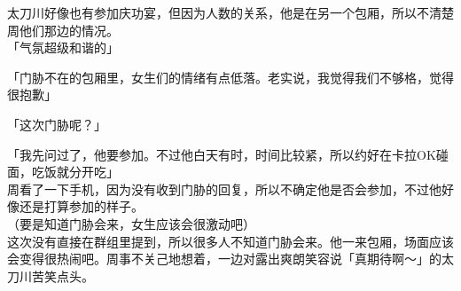 太刀川好像也有参加庆功宴，但因为人数的关系，他是在另一个包厢，所以不清楚周他们那边的情况。\\

「气氛超级和谐的」

「门胁不在的包厢里，女生们的情绪有点低落。老实说，我觉得我们不够格，觉得很抱歉」

「这次门胁呢？」

「我先问过了，他要参加。不过他白天有时，时间比较紧，所以约好在卡拉OK碰面，吃饭就分开吃」\\

周看了一下手机，因为没有收到门胁的回复，所以不确定他是否会参加，不过他好像还是打算参加的样子。\\

（要是知道门胁会来，女生应该会很激动吧）\\

这次没有直接在群组里提到，所以很多人不知道门胁会来。他一来包厢，场面应该会变得很热闹吧。周事不关己地想着，一边对露出爽朗笑容说「真期待啊～」的太刀川苦笑点头。
